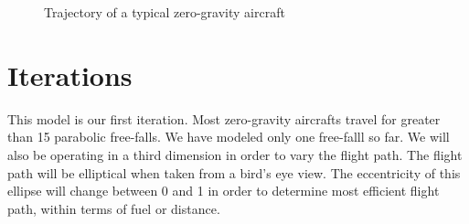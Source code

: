 \documentclass[11pt]{article} %
\begin{document}
\begin{figure}[h!]
\begin{center}
\caption{Trajectory of a typical zero-gravity aircraft}
\label{fig:figure1}
\end{center}
\end{figure}

\section*{Iterations}
This model is our first iteration. Most zero-gravity aircrafts travel for greater than 15 parabolic free-falls. We have modeled only one free-falll so far. We will also be operating in a third dimension in order to vary the flight path. The flight path will be elliptical when taken from a bird's eye view. The eccentricity of this ellipse will change between 0 and 1 in order to determine most efficient flight path, within terms of fuel or distance. 

\end{document}
